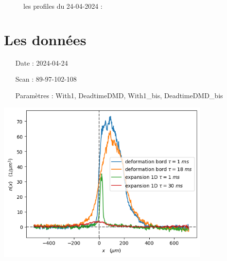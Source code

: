 \documentclass[a3, 10pt,twoside]{article}          %
\theoremstyle{plain}
\theoremstyle{definition}
\theoremstyle{remark}
\theoremstyle{definition} %
\begin{document}
	
	
	
	
	
	
	
	\begin{figure}[h]
        \centering
	\caption{les profiles du 24-04-2024 : }
        \label{fig:donnes}
    \end{figure}
    
    
    
	\section{Les données } 
	
	\begin{minipage}[b]{0.45\textwidth} 
    \begin{itemize}
        \item[Date :] 2024-04-24
        \item[Scan :] 89-97-102-108
        \item[Paramètres :] With1, DeadtimeDMD, With1\_bis, DeadtimeDMD\_bis
    \end{itemize}

    \vspace{1em} %
    
        \centering
        \includegraphics[width=0.8\textwidth]{Figures/donnees_24-04-2024} %

    \vspace{1em} %
    

\end{minipage}
\end{document}
